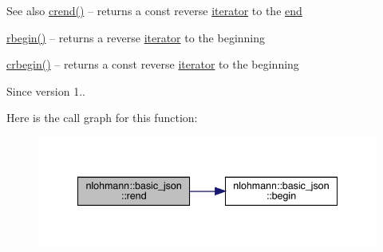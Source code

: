 \begin{DoxySeeAlso}{See also}
\mbox{\hyperlink{classnlohmann_1_1basic__json_a5795b029dbf28e0cb2c7a439ec5d0a88}{crend()}} -- returns a const reverse \mbox{\hyperlink{classnlohmann_1_1basic__json_a099316232c76c034030a38faa6e34dca}{iterator}} to the \mbox{\hyperlink{classnlohmann_1_1basic__json_a13e032a02a7fd8a93fdddc2fcbc4763c}{end}} 

\mbox{\hyperlink{classnlohmann_1_1basic__json_a1ef93e2006dbe52667294f5ef38b0b10}{rbegin()}} -- returns a reverse \mbox{\hyperlink{classnlohmann_1_1basic__json_a099316232c76c034030a38faa6e34dca}{iterator}} to the beginning 

\mbox{\hyperlink{classnlohmann_1_1basic__json_a1e0769d22d54573f294da0e5c6abc9de}{crbegin()}} -- returns a const reverse \mbox{\hyperlink{classnlohmann_1_1basic__json_a099316232c76c034030a38faa6e34dca}{iterator}} to the beginning
\end{DoxySeeAlso}
\begin{DoxySince}{Since}
version 1.. 
\end{DoxySince}
Here is the call graph for this function\+:
\nopagebreak
\begin{figure}[H]
\begin{center}
\leavevmode
\includegraphics[width=341pt]{classnlohmann_1_1basic__json_ac77aed0925d447744676725ab0b6d535_cgraph}
\end{center}
\end{figure}
\mbox{\label{classnlohmann_1_1basic__json_a4f73d4cee67ea328d785979c22af0ae1}} 
